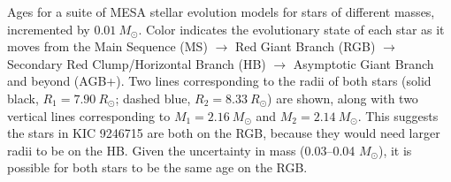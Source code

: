 \label{fig:mesa} Ages for a suite of MESA stellar evolution models for stars of different masses, incremented by $0.01 \ M_\odot$. Color indicates the evolutionary state of each star as it moves from the Main Sequence (MS) $\rightarrow$ Red Giant Branch (RGB) $\rightarrow$ Secondary Red Clump/Horizontal Branch (HB) $\rightarrow$ Asymptotic Giant Branch and beyond (AGB+). Two lines corresponding to the radii of both stars (solid black, $R_1 = 7.90 \ R_\odot$; dashed blue, $R_2 = 8.33 \ R_\odot$) are shown, along with two vertical lines corresponding to $M_1 = 2.16 \ M_\odot$ and $M_2 = 2.14 \ M_\odot$. This suggests the stars in KIC 9246715 are both on the RGB, because they would need larger radii to be on the HB. Given the uncertainty in mass (0.03--0.04 $M_\odot$), it is possible for both stars to be the same age on the RGB.
